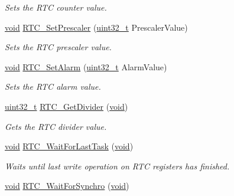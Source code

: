 \begin{DoxyCompactItemize}
\begin{DoxyCompactList}\small\item\em Sets the R\+TC counter value. \end{DoxyCompactList}\item 
\hyperlink{usb__devapi_8h_afabf60e7f57651d6d595a02c75f07cd0}{void} \hyperlink{group___r_t_c___private___functions_gaf76be6071d1ba65b009e0791069e602c}{R\+T\+C\+\_\+\+Set\+Prescaler} (\hyperlink{_p_e___types_8h_a33594304e786b158f3fb30289278f5af}{uint32\+\_\+t} Prescaler\+Value)
\begin{DoxyCompactList}\small\item\em Sets the R\+TC prescaler value. \end{DoxyCompactList}\item 
\hyperlink{usb__devapi_8h_afabf60e7f57651d6d595a02c75f07cd0}{void} \hyperlink{group___r_t_c___private___functions_gaec644c636a30ab5e287ba60ffc77132c}{R\+T\+C\+\_\+\+Set\+Alarm} (\hyperlink{_p_e___types_8h_a33594304e786b158f3fb30289278f5af}{uint32\+\_\+t} Alarm\+Value)
\begin{DoxyCompactList}\small\item\em Sets the R\+TC alarm value. \end{DoxyCompactList}\item 
\hyperlink{_p_e___types_8h_a33594304e786b158f3fb30289278f5af}{uint32\+\_\+t} \hyperlink{group___r_t_c___private___functions_gaa4f00e0469fedcf6cbf23760e6d801ed}{R\+T\+C\+\_\+\+Get\+Divider} (\hyperlink{usb__devapi_8h_afabf60e7f57651d6d595a02c75f07cd0}{void})
\begin{DoxyCompactList}\small\item\em Gets the R\+TC divider value. \end{DoxyCompactList}\item 
\hyperlink{usb__devapi_8h_afabf60e7f57651d6d595a02c75f07cd0}{void} \hyperlink{group___r_t_c___private___functions_gaa0a406ef860d5231748c5f0d82673036}{R\+T\+C\+\_\+\+Wait\+For\+Last\+Task} (\hyperlink{usb__devapi_8h_afabf60e7f57651d6d595a02c75f07cd0}{void})
\begin{DoxyCompactList}\small\item\em Waits until last write operation on R\+TC registers has finished. \end{DoxyCompactList}\item 
\hyperlink{usb__devapi_8h_afabf60e7f57651d6d595a02c75f07cd0}{void} \hyperlink{group___r_t_c___private___functions_gaca4346e0dc15dccc15179786b28450db}{R\+T\+C\+\_\+\+Wait\+For\+Synchro} (\hyperlink{usb__devapi_8h_afabf60e7f57651d6d595a02c75f07cd0}{void})

\end{DoxyCompactItemize}
